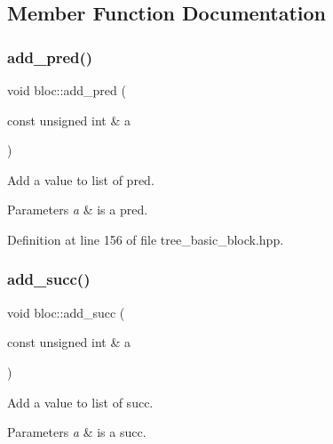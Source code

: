 \subsection{Member Function Documentation}
\mbox{\label{structbloc_a89e0e5895060e4c29dfd1ece24d509f3}} 
\subsubsection{\texorpdfstring{add\+\_\+pred()}{add\_pred()}}
{\footnotesize\ttfamily void bloc\+::add\+\_\+pred (\begin{DoxyParamCaption}\item[{const unsigned int \&}]{a }\end{DoxyParamCaption})\hspace{0.3cm}{\ttfamily [inline]}}



Add a value to list of pred. 


\begin{DoxyParams}{Parameters}
{\em a} & is a pred. \\
\hline
\end{DoxyParams}


Definition at line 156 of file tree\+\_\+basic\+\_\+block.\+hpp.

\mbox{\label{structbloc_a62a5f0d5a5249e803702c15acd3b433d}} 
\subsubsection{\texorpdfstring{add\+\_\+succ()}{add\_succ()}}
{\footnotesize\ttfamily void bloc\+::add\+\_\+succ (\begin{DoxyParamCaption}\item[{const unsigned int \&}]{a }\end{DoxyParamCaption})\hspace{0.3cm}{\ttfamily [inline]}}



Add a value to list of succ. 


\begin{DoxyParams}{Parameters}
{\em a} & is a succ. \\
\hline
\end{DoxyParams}


